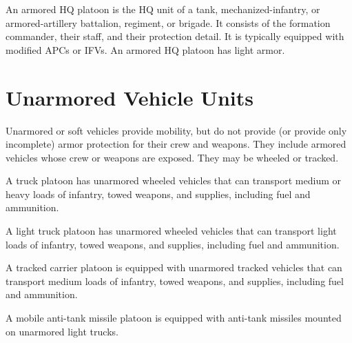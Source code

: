 
An armored HQ platoon is the HQ unit of a tank, mechanized-infantry, or armored-artillery battalion, regiment, or brigade. It consists of the formation commander, their staff, and their protection detail.
It is typically equipped with modified APCs or IFVs.
An armored HQ platoon has light armor.

\section{Unarmored Vehicle Units}

Unarmored or soft vehicles provide mobility, but do not provide (or provide only incomplete) armor protection for their crew and weapons. They include armored vehicles whose crew or weapons are exposed. They may be wheeled or tracked.


A truck platoon has unarmored wheeled vehicles that can transport medium or heavy loads of infantry, towed weapons, and supplies, including fuel and ammunition.


A light truck platoon has unarmored wheeled vehicles that can transport light loads of infantry, towed weapons, and supplies, including fuel and ammunition.

A tracked carrier platoon is equipped with unarmored tracked vehicles that can transport medium loads of infantry, towed weapons, and supplies, including fuel and ammunition.
%


A mobile anti-tank missile platoon is equipped with anti-tank missiles mounted on unarmored light trucks. 


